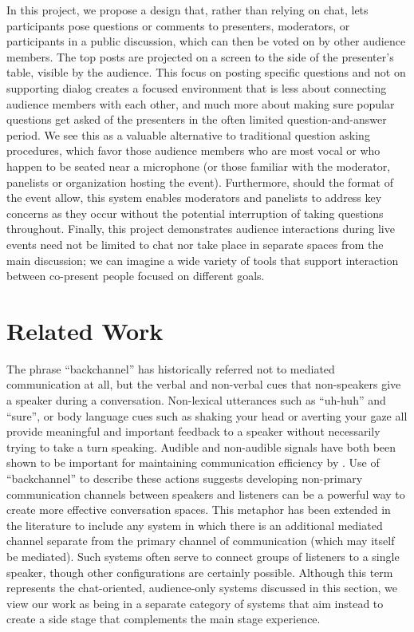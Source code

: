 In this project, we propose a design that, rather than relying on chat, lets participants pose questions or comments to presenters, moderators, or participants in a public discussion, which can then be voted on by other audience members. The top posts are projected on a screen to the side of the presenter's table, visible by the audience. This focus on posting specific questions and not on supporting dialog creates a focused environment that is less about connecting audience members with each other, and much more about making sure popular questions get asked of the presenters in the often limited question-and-answer period. We see this as a valuable alternative to traditional question asking procedures, which favor those audience members who are most vocal or who happen to be seated near a microphone (or those familiar with the moderator, panelists or organization hosting the event). Furthermore, should the format of the event allow, this system enables moderators and panelists to address key concerns as they occur without the potential interruption of taking questions throughout. Finally, this project demonstrates audience interactions during live events need not be limited to chat nor take place in separate spaces from the main discussion; we can imagine a wide variety of tools that support interaction between co-present people focused on different goals.

\section{Related Work}

The phrase ``backchannel'' has historically referred not to mediated communication at all, but the verbal and non-verbal cues that non-speakers give a speaker during a conversation. Non-lexical utterances such as ``uh-huh'' and ``sure'', or body language cues such as shaking your head or averting your gaze all provide meaningful and important feedback to a speaker without necessarily trying to take a turn speaking. Audible and non-audible signals have both been shown to be important for maintaining communication efficiency by \citet{Krauss:1977bu}. Use of ``backchannel'' to describe these actions suggests developing non-primary communication channels between speakers and listeners can be a powerful way to create more effective conversation spaces. This metaphor has been extended in the literature to include any system in which there is an additional mediated channel separate from the primary channel of communication (which may itself be mediated). Such systems often serve to connect groups of listeners to a single speaker, though other configurations are certainly possible. Although this term represents the chat-oriented, audience-only systems discussed in this section, we view our work as being in a separate category of systems that aim instead to create a side stage that complements the main stage experience. 

